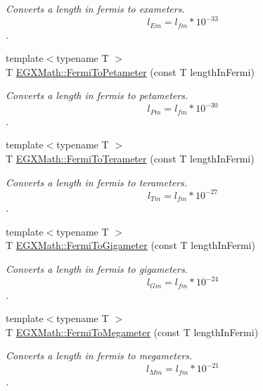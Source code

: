 \begin{DoxyCompactItemize}
\begin{DoxyCompactList}\small\item\em Converts a length in fermis to exameters. \[ l_{Em}=l_{fm} * 10^{-33} \]. \end{DoxyCompactList}\item 
{\footnotesize template$<$typename T $>$ }\\T \mbox{\hyperlink{group___e_g_x_math-_conversions-_length_conversions-_non-_s_i-_fermi-_s_i_ga49b952393c3827f4bcf231331f2bbc3a}{E\+G\+X\+Math\+::\+Fermi\+To\+Petameter}} (const T length\+In\+Fermi)
\begin{DoxyCompactList}\small\item\em Converts a length in fermis to petameters. \[ l_{Pm}=l_{fm} * 10^{-30} \]. \end{DoxyCompactList}\item 
{\footnotesize template$<$typename T $>$ }\\T \mbox{\hyperlink{group___e_g_x_math-_conversions-_length_conversions-_non-_s_i-_fermi-_s_i_gaeec616a22461720c918d6dc60c3d7fbb}{E\+G\+X\+Math\+::\+Fermi\+To\+Terameter}} (const T length\+In\+Fermi)
\begin{DoxyCompactList}\small\item\em Converts a length in fermis to terameters. \[ l_{Tm}=l_{fm} * 10^{-27} \]. \end{DoxyCompactList}\item 
{\footnotesize template$<$typename T $>$ }\\T \mbox{\hyperlink{group___e_g_x_math-_conversions-_length_conversions-_non-_s_i-_fermi-_s_i_gab1a1a212d0f0091293bc41c7c9cf5f41}{E\+G\+X\+Math\+::\+Fermi\+To\+Gigameter}} (const T length\+In\+Fermi)
\begin{DoxyCompactList}\small\item\em Converts a length in fermis to gigameters. \[ l_{Gm}=l_{fm} * 10^{-24} \]. \end{DoxyCompactList}\item 
{\footnotesize template$<$typename T $>$ }\\T \mbox{\hyperlink{group___e_g_x_math-_conversions-_length_conversions-_non-_s_i-_fermi-_s_i_ga5a9bfb0faa55f320e61263103a17da64}{E\+G\+X\+Math\+::\+Fermi\+To\+Megameter}} (const T length\+In\+Fermi)
\begin{DoxyCompactList}\small\item\em Converts a length in fermis to megameters. \[ l_{Mm}=l_{fm} * 10^{-21} \]. \end{DoxyCompactList}\item 

\end{DoxyCompactItemize}
